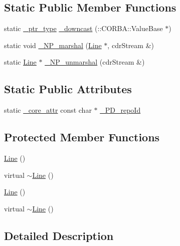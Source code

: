 \subsection*{Static Public Member Functions}
\begin{DoxyCompactItemize}
\item 
static \hyperlink{class_draw_a5164256572b3c4123ceecd1897c248dd}{\+\_\+ptr\+\_\+type} \hyperlink{class_line_afa65669cf372e878732863fd66902d1d}{\+\_\+downcast} (\+::C\+O\+R\+B\+A\+::\+Value\+Base $\ast$)
\item 
static void \hyperlink{class_line_ae2475a529c9b0ed1f7eb9ca396b35999}{\+\_\+\+N\+P\+\_\+marshal} (\hyperlink{class_line}{Line} $\ast$, cdr\+Stream \&)
\item 
static \hyperlink{class_line}{Line} $\ast$ \hyperlink{class_line_a81748df80cd480d249f192c649df8e1e}{\+\_\+\+N\+P\+\_\+unmarshal} (cdr\+Stream \&)
\end{DoxyCompactItemize}
\subsection*{Static Public Attributes}
\begin{DoxyCompactItemize}
\item 
static \hyperlink{_petit_prince_8hpp_a5f7bf7cddb608c2aad7c95f55f8a33c5}{\+\_\+core\+\_\+attr} const char $\ast$ \hyperlink{class_line_a38707cdd2f006195ad299c521928dc32}{\+\_\+\+P\+D\+\_\+repo\+Id}
\end{DoxyCompactItemize}
\subsection*{Protected Member Functions}
\begin{DoxyCompactItemize}
\item 
\hyperlink{class_line_acc11b8a429d8cdd63ba6803dff5602b3}{Line} ()
\item 
virtual \hyperlink{class_line_a4a95bafcefa28672b3999deb011b9e50}{$\sim$\+Line} ()
\item 
\hyperlink{class_line_acc11b8a429d8cdd63ba6803dff5602b3}{Line} ()
\item 
virtual \hyperlink{class_line_a4a95bafcefa28672b3999deb011b9e50}{$\sim$\+Line} ()
\end{DoxyCompactItemize}


\subsection{Detailed Description}


